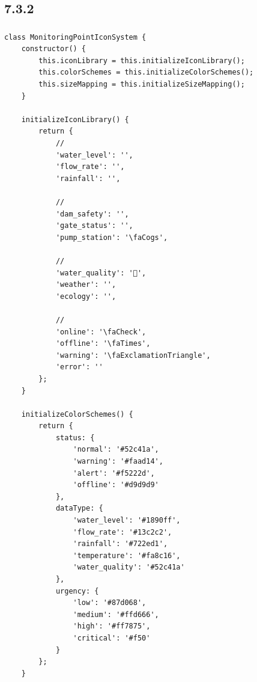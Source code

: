\hypertarget{section-145}{%
\subsection{7.3.2}\label{section-145}}

\hypertarget{section-146}{%
\subsubsection{}\label{section-146}}

\hypertarget{section-147}{%
\paragraph{}\label{section-147}}

\begin{lstlisting}[style=javascript]
class MonitoringPointIconSystem {
    constructor() {
        this.iconLibrary = this.initializeIconLibrary();
        this.colorSchemes = this.initializeColorSchemes();
        this.sizeMapping = this.initializeSizeMapping();
    }
    
    initializeIconLibrary() {
        return {
            // 
            'water_level': '',
            'flow_rate': '',
            'rainfall': '',
            
            // 
            'dam_safety': '',
            'gate_status': '',
            'pump_station': '\faCogs',
            
            // 
            'water_quality': '🧪',
            'weather': '',
            'ecology': '',
            
            // 
            'online': '\faCheck',
            'offline': '\faTimes',
            'warning': '\faExclamationTriangle',
            'error': ''
        };
    }
    
    initializeColorSchemes() {
        return {
            status: {
                'normal': '#52c41a',
                'warning': '#faad14',
                'alert': '#f5222d',
                'offline': '#d9d9d9'
            },
            dataType: {
                'water_level': '#1890ff',
                'flow_rate': '#13c2c2',
                'rainfall': '#722ed1',
                'temperature': '#fa8c16',
                'water_quality': '#52c41a'
            },
            urgency: {
                'low': '#87d068',
                'medium': '#ffd666',
                'high': '#ff7875',
                'critical': '#f50'
            }
        };
    }
    

\end{lstlisting}
